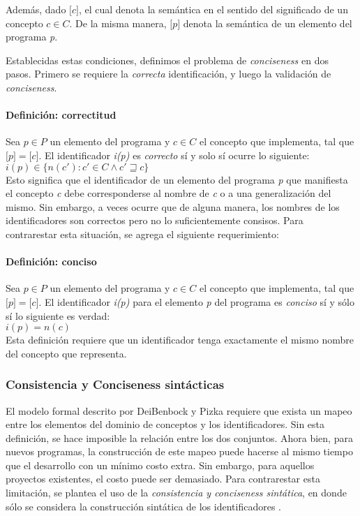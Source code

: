 Además, dado $\lbrack c \rbrack$, el cual denota la semántica en el sentido del significado de un concepto $c \in C$. De la misma manera, $\lbrack p \rbrack$ denota la semántica de un elemento del programa \textit{p}.

Establecidas estas condiciones, definimos el problema de \textit{conciseness} en dos pasos. Primero se requiere la \textit{correcta} identificación, y luego la validación de \textit{conciseness}.

\paragraph{Definición: correctitud}
Sea $p \in P$ un elemento del programa y $c \in C$ el concepto que implementa, tal que $\lbrack p \rbrack = \lbrack c \rbrack$. El identificador \textit{i(p)} es \textit{correcto} sí y solo sí ocurre lo siguiente:
\\$i(p) \in \lbrace n(c') : c' \in C \land c' \sqsupseteq c \rbrace$
\\Esto significa que el identificador de un elemento del programa \textit{p} que manifiesta el concepto \textit{c} debe corresponderse al nombre de \textit{c} o a una generalización del mismo. Sin embargo, a veces ocurre que de alguna manera, los nombres de los identificadores son correctos pero no lo suficientemente consisos. Para contrarestar esta situación, se agrega el siguiente requerimiento:

\paragraph{Definición: conciso}
Sea $p \in P$ un elemento del programa y $c \in C$ el concepto que implementa, tal que $\lbrack p \rbrack = \lbrack c \rbrack$. El identificador \textit{i(p)} para el elemento \textit{p} del programa es \textit{conciso} sí y sólo sí lo siguiente es verdad:
\\$i(p) = n(c)$
\\Esta definición requiere que un identificador tenga exactamente el mismo nombre del concepto que representa.

\subsubsection{Consistencia y Conciseness sintácticas}
El modelo formal descrito por DeiBenbock y Pizka requiere que exista un mapeo entre los elementos del dominio de conceptos y los identificadores. Sin esta definición, se hace imposible la relación entre los dos conjuntos. Ahora bien, para nuevos programas, la construcción de este mapeo puede hacerse al mismo tiempo que el desarrollo con un mínimo costo extra. Sin embargo, para aquellos proyectos existentes, el costo puede ser demasiado. Para contrarestar esta limitación, se plantea el uso de la \textit{consistencia y conciseness sintática}, en donde sólo se considera la construcción sintática de los identificadores \cite{LawrieFeildBinkley06}.

